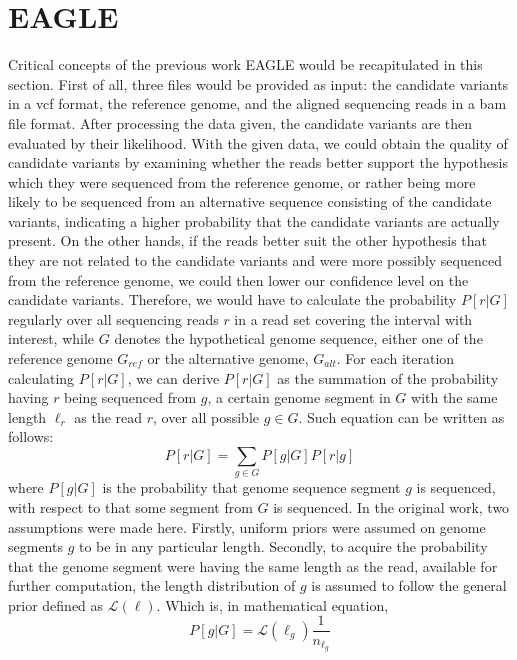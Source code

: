 \documentclass{PHlab-thesis}
\begin{document}
\section{EAGLE}
Critical concepts of the previous work EAGLE would be recapitulated in this section. First of all, three files would be provided as input: the candidate variants in a vcf format, the reference genome, and the aligned sequencing reads in a bam file format. After processing the data given, the candidate variants are then evaluated by their likelihood. With the given data, we could obtain the quality of candidate variants by examining whether the reads better support the hypothesis which they were sequenced from the reference genome, or rather being more likely to be sequenced from an alternative sequence consisting of the candidate variants, indicating a higher probability that the candidate variants are actually present. On the other hands, if the reads better suit the other hypothesis that they are not related to the candidate variants and were more possibly sequenced from the reference genome, we could then lower our confidence level on the candidate variants. Therefore, we would have to calculate the probability $P[r|G]$ regularly over all sequencing reads $r$ in a read set covering the interval with interest, while $G$ denotes the hypothetical genome sequence, either one of the reference genome $G_{ref}$ or the alternative genome, $G_{alt}$. For each iteration calculating $P[r|G]$, we can derive $P[r|G]$ as the summation of the probability having $r$ being sequenced from $g$, a certain genome segment in $G$ with the same length $\ell_r$ as the read $r$, over all possible ${g\in G}$. Such equation can be written as follows:
\begin{equation}
P[r|G] = \sum_{g\in G} P[g|G] P[r|g]
\end{equation}
where $P[g|G]$ is the probability that genome sequence segment $g$ is sequenced, with respect to that some segment from $G$ is sequenced. In the original work, two assumptions were made here. Firstly, uniform priors were assumed on genome segments $g$ to be in any particular length. Secondly, to acquire the probability that the genome segment were having the same length as the read, available for further computation, the length distribution of $g$ is assumed to follow the general prior defined as $\mathcal{L}(\ell)$. Which is, in mathematical equation,
\begin{equation}
P[g|G] = \mathcal{L}(\ell_g) \frac{1}{n_{\ell_g}}
\end{equation}
\end{document}
